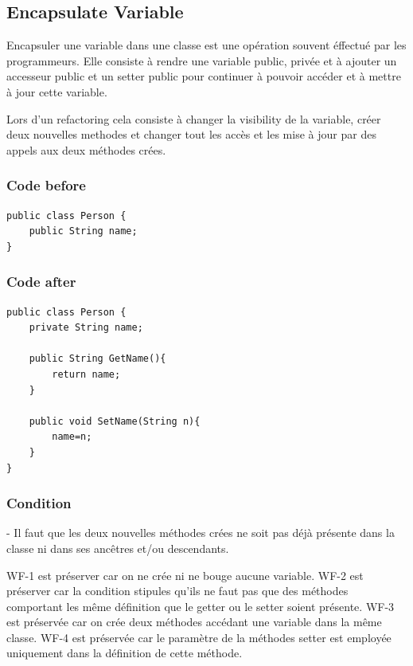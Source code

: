 \documentclass[a4paper, 10pt]{article}
\begin{document}
\subsection{Encapsulate Variable}

Encapsuler une variable dans une classe est une opération souvent éffectué par les programmeurs. 
Elle consiste à rendre une variable public, privée et à ajouter un accesseur public et un setter public pour continuer à pouvoir accéder et à mettre à jour cette variable.

Lors d'un refactoring cela consiste à changer la visibility de la variable, créer deux nouvelles methodes et changer tout les accès et les mise à jour par des appels aux deux méthodes crées.


\subsubsection{Code before}

\begin{lstlisting}[frame=single]
public class Person {
	public String name;
}
\end{lstlisting}

\subsubsection{Code after}

\begin{lstlisting}[frame=single]
public class Person {
	private String name;
	
	public String GetName(){
		return name;
	}

	public void SetName(String n){
		name=n;
	}
}
\end{lstlisting}

\subsubsection{Condition}

- Il faut que les deux nouvelles méthodes crées ne soit pas déjà présente dans la classe ni dans ses ancêtres et/ou descendants.

WF-1 est préserver car on ne crée ni ne bouge aucune variable.
WF-2 est préserver car la condition stipules qu'ils ne faut pas que des méthodes comportant les même définition que le getter ou le setter soient présente.
WF-3 est préservée car on crée deux méthodes accédant une variable dans la même classe.
WF-4 est préservée car le paramètre de la méthodes setter est employée uniquement dans la définition de cette méthode.
\end{document}
